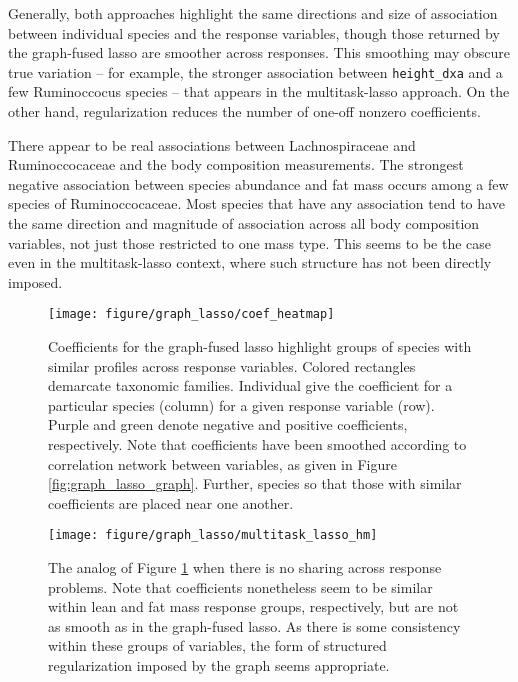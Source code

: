 \documentclass{article}
\begin{document}
Generally, both approaches highlight the same directions and size
of association between individual species and the response variables, though
those returned by the graph-fused lasso are smoother across responses. This
smoothing may obscure true variation -- for example, the stronger association
between \texttt{height\_dxa} and a few Ruminoccocus species -- that appears in
the multitask-lasso approach. On the other hand, regularization reduces the
number of one-off nonzero coefficients.

There appear to be real associations between Lachnospiraceae and Ruminoccocaceae
and the body composition measurements. The strongest negative association
between species abundance and fat mass occurs among a few species of
Ruminoccocaceae. Most species that have any association tend to have the same
direction and magnitude of association across all body composition variables,
not just those restricted to one mass type. This seems to be the case even in
the multitask-lasso context, where such structure has not been directly imposed.

\begin{figure}[ht]
  \centering
  \texttt{[image: figure/graph\_lasso/coef\_heatmap]}
  \caption{Coefficients for the graph-fused lasso highlight groups of species
    with similar profiles across response
    variables. Colored rectangles demarcate taxonomic families. Individual give
    the coefficient for a particular species (column) for a given response
    variable (row). Purple and green denote negative and positive coefficients,
    respectively. Note that coefficients have been smoothed according to
    correlation network between variables, as given in Figure
    \ref{fig:graph_lasso_graph}. Further, species so that those with similar
    coefficients are placed near one
    another. \label{fig:graph_lasso_coef_heatmap} }
\end{figure}

\begin{figure}[ht]
  \centering
  \texttt{[image: figure/graph\_lasso/multitask\_lasso\_hm]}
  \caption{The analog of Figure \ref{fig:graph_lasso_coef_heatmap} when there is
    no sharing across response problems. Note that coefficients nonetheless seem
    to be similar within lean and fat mass response groups, respectively, but
    are not as smooth as in the graph-fused lasso. As there is some consistency
    within these groups of variables, the form of structured regularization
    imposed by the graph seems
    appropriate. \label{fig:graph_lasso_multitask_lasso_hm} }
\end{figure}
\end{document}

